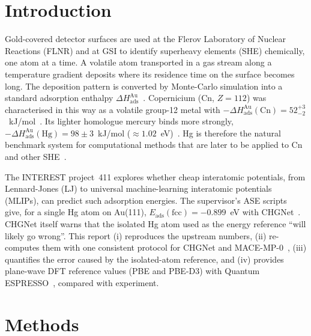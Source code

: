 \documentclass[11pt,a4paper]{article}
\newcommand{\Eads}{E_\mathrm{ads}}
\begin{document}
\section{Introduction}
Gold-covered detector surfaces are used at the Flerov Laboratory of Nuclear Reactions (FLNR) and at GSI to identify superheavy elements (SHE) chemically, one atom at a time. A volatile atom transported in a gas stream along a temperature gradient deposits where its residence time on the surface becomes long. The deposition pattern is converted by Monte-Carlo simulation into a standard adsorption enthalpy $\Delta H_\mathrm{ads}^\mathrm{Au}$~\cite{soverna2005,eichler2007,eichler2008,lens2018}. Copernicium (Cn, $Z=112$) was characterised in this way as a volatile group-12 metal with $-\Delta H_\mathrm{ads}^\mathrm{Au}(\mathrm{Cn}) = 52^{+3}_{-2}$~kJ/mol~\cite{eichler2007,eichler2013}. Its lighter homologue mercury binds more strongly, $-\Delta H_\mathrm{ads}^\mathrm{Au}(\mathrm{Hg}) = 98\pm3$~kJ/mol ($\approx 1.02$~eV)~\cite{soverna2005,lens2018}. Hg is therefore the natural benchmark system for computational methods that are later to be applied to Cn and other SHE~\cite{gaston2007,pershina2009}.

The INTEREST project~411 explores whether cheap interatomic potentials, from Lennard-Jones (LJ) to universal machine-learning interatomic potentials (MLIPs), can predict such adsorption energies. The supervisor's ASE scripts~\cite{upstream,ase} give, for a single Hg atom on Au(111), $\Eads(\mathrm{fcc}) = -0.899$~eV with CHGNet~\cite{chgnet}. CHGNet itself warns that the isolated Hg atom used as the energy reference ``will likely go wrong''. This report
(i) reproduces the upstream numbers,
(ii) re-computes them with one consistent protocol for CHGNet and MACE-MP-0~\cite{mace,macemp0},
(iii) quantifies the error caused by the isolated-atom reference, and
(iv) provides plane-wave DFT reference values (PBE and PBE-D3) with Quantum ESPRESSO~\cite{qe2009,qe2017}, compared with experiment.

\section{Methods}
\end{document}
